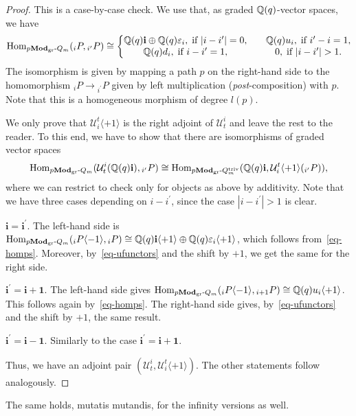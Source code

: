 \begin{proof}
This is a case-by-case check. 
We use that, as graded $\mathbb{Q}(q)$-vector spaces, we have
\begin{equation}\label{eq-homps}
\Hom_{\pModgrAm}({}_iP,{}_{i^{\prime}}P)\cong\biggl\{
\begin{matrix}
 \bC\bbi\oplus\bC\varepsilon_i,\; \text{if }|i-i^{\prime}|=0, & & \bC u_{i},\;\text{if }i^{\prime}-i=1,\\
 \bC d_{i},\;\text{if }i-i^{\prime}=1, & & 0,\;\text{if }|i-i^{\prime}|>1.
\end{matrix}
\end{equation}
The isomorphism is given by mapping a 
path $p$ on the right-hand side to the 
homomorphism ${}_iP\to {}_{i^{\prime}}P$ 
given by left multiplication 
(\textit{post}-composition) with $p$. 
Note that this is a homogeneous morphism of degree $l(p)$.


We only 
prove that $\mathcal U^t_i\langle+1\rangle$ is 
the right adjoint of $\mathcal U_t^i$ and leave the rest to the reader.
To this end, we have to show that there are isomorphisms of graded vector spaces
\[
\mathrm{Hom}_{p\boldsymbol{\mathrm{Mod}}_{\mathrm{gr}}\text{-}Q_m}(\mathcal U_t^i(\mathbb{Q}(q)\boldsymbol{\mathrm{i}}),{}_{i^{\prime}}P)\cong\mathrm{Hom}_{p\boldsymbol{\mathrm{Mod}}_{\mathrm{gr}}\text{-}Q_m^{\mathrm{triv}}}(\mathbb{Q}(q)\boldsymbol{\mathrm{i}},\mathcal U^t_i\langle+1\rangle({}_{i^{\prime}}P)),
\]
where we can restrict to check only for objects 
as above by additivity. Note that we have three 
cases depending on $i-i^{\prime}$, since the case 
$|i-i^{\prime}|>1$ is clear.


$\boldsymbol{i=i^{\prime}}$. The left-hand side is 
$\mathrm{Hom}_{p\boldsymbol{\mathrm{Mod}}_{\mathrm{gr}}\text{-}Q_m}({}_iP\langle-1\rangle,{}_iP)\cong \mathbb{Q}(q)\boldsymbol{\mathrm{i}}\langle+1\rangle\oplus \mathbb{Q}(q)\varepsilon_i\langle+1\rangle$, which follows from~\eqref{eq-homps}. 
Moreover, by~\eqref{eq-ufunctors} and the shift by $+1$, we get the same for the right side.



$\boldsymbol{i^{\prime}=i+1}$. The left-hand 
side gives $\mathrm{Hom}_{p\boldsymbol{\mathrm{Mod}}_{\mathrm{gr}}\text{-}Q_m}({}_iP\langle-1\rangle,{}_{i+1}P)\cong \mathbb{Q}(q) u_i\langle+1\rangle$. This follows again by~\eqref{eq-homps}. The right-hand side gives, 
by~\eqref{eq-ufunctors} and the shift by 
$+1$, the same result.

$\boldsymbol{i^{\prime}=i-1}$. Similarly to the case $\boldsymbol{i^{\prime}=i+1}$.


Thus, we have an adjoint pair 
$(\mathcal U_t^i,\mathcal U^t_i\langle+1\rangle)$. 
The other statements follow analogously.
\end{proof}


The same holds, mutatis mutandis, for the infinity 
versions as well.


